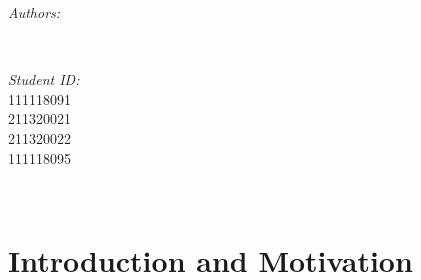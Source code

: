 \documentclass[12pt]{article}
\makeatletter
\let\theauthor\@author
\makeatother
\begin{document}
\begin{titlepage}
	\begin{minipage}{0.4\textwidth}
		\begin{flushleft} \large
			\emph{Authors:}\\
			\theauthor
			\end{flushleft}
			\end{minipage}~
			\begin{minipage}{0.4\textwidth}
			\begin{flushright} \large
			\emph{Student ID:} \\
			111118091 \\ 211320021 \\ 211320022 \\ 111118095%
		\end{flushright}
	\end{minipage}\\
	
	
 
	\vfill
	
\end{titlepage}


{\small \tableofcontents}
\pagebreak

\flushbottom


\section{Introduction and Motivation}
\end{document}

